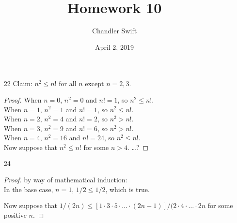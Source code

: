 \documentclass{article}
\title{Homework 10}
\author{Chandler Swift}
\date{April 2, 2019}
\begin{document}
\maketitle
\begin{enumerate}

%
%

  \item[22] Claim: $n^2 \leq n!$ for all $n$ except $n=2,3$.
    \begin{proof}
      When $n=0$, $n^2=0$ and $n!=1$, so $n^2 \leq n!$.\\
      When $n=1$, $n^2=1$ and $n!=1$, so $n^2 \leq n!$.\\
      When $n=2$, $n^2=4$ and $n!=2$, so $n^2 > n!$.\\
      When $n=3$, $n^2=9$ and $n!=6$, so $n^2 > n!$.\\
      When $n=4$, $n^2=16$ and $n!=24$, so $n^2 \leq n!$.\\
      
      Now suppose that $n^2 \leq n!$ for some $n>4$. \dots?
    \end{proof}
  \item[24]
    \begin{proof} by way of mathematical induction:\\
      In the base case, $n=1$, $1/2 \leq 1/2$, which is true.

      Now suppose that $1/(2n) \leq [1 \cdot 3 \cdot 5 \cdot \dots \cdot
      (2n-1)]/(2 \cdot 4 \cdot \dots \cdot 2n$ for some positive $n$.


\end{proof}
\end{enumerate}
\end{document}
